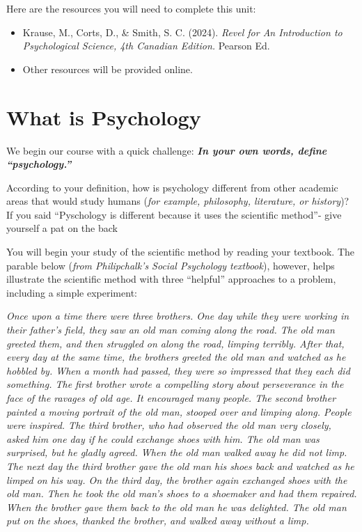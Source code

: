 \documentclass[
]{book}
\providecommand{\tightlist}{%
  \setlength{\itemsep}{0pt}\setlength{\parskip}{0pt}}
\begin{document}
Here are the resources you will need to complete this unit:

\begin{itemize}
\tightlist
\item
  Krause, M., Corts, D., \& Smith, S. C. (2024). \emph{Revel for An Introduction to Psychological Science, 4th Canadian Edition.} Pearson Ed.\\
\item
  Other resources will be provided online.
\end{itemize}

\hypertarget{what-is-psychology}{%
\section{What is Psychology}\label{what-is-psychology}}

We begin our course with a quick challenge: \textbf{\emph{In your own words, define ``psychology.''}}

According to your definition, how is psychology different from other academic areas that would study humans (\emph{for example, philosophy, literature, or history})? If you said ``Pyschology is different because it uses the scientific method''- give yourself a pat on the back

You will begin your study of the scientific method by reading your textbook. The parable below (\emph{from Philipchalk's Social Psychology textbook}), however, helps illustrate the scientific method with three ``helpful'' approaches to a problem, including a simple experiment:

\emph{Once upon a time there were three brothers. One day while they were working in their father's field, they saw an old man coming along the road. The old man greeted them, and then struggled on along the road, limping terribly. After that, every day at the same time, the brothers greeted the old man and watched as he hobbled by. When a month had passed, they were so impressed that they each did something. The first brother wrote a compelling story about perseverance in the face of the ravages of old age. It encouraged many people. The second brother painted a moving portrait of the old man, stooped over and limping along. People were inspired. The third brother, who had observed the old man very closely, asked him one day if he could exchange shoes with him. The old man was surprised, but he gladly agreed. When the old man walked away he did not limp. The next day the third brother gave the old man his shoes back and watched as he limped on his way. On the third day, the brother again exchanged shoes with the old man. Then he took the old man's shoes to a shoemaker and had them repaired. When the brother gave them back to the old man he was delighted. The old man put on the shoes, thanked the brother, and walked away without a limp.}
\end{document}
